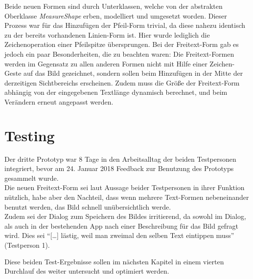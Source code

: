 Beide neuen Formen sind durch Unterklassen, welche von der abstrakten Oberklasse \emph{MeasureShape} erben, modelliert und umgesetzt worden.
Dieser Prozess war für das Hinzufügen der Pfeil-Form trivial, da diese nahezu identisch zu der bereits vorhandenen Linien-Form ist.
Hier wurde lediglich die Zeichenoperation einer Pfeilspitze übersprungen.
Bei der Freitext-Form gab es jedoch ein paar Besonderheiten, die zu beachten waren:
Die Freitext-Formen werden im Gegensatz zu allen anderen Formen nicht mit Hilfe einer Zeichen-Geste auf das Bild gezeichnet, sondern sollen beim Hinzufügen in der Mitte der derzeitigen Sichtbereichs erscheinen.
Zudem muss die Größe der Freitext-Form abhängig von der eingegebenen Textlänge dynamisch berechnet, und beim Verändern erneut angepasst werden. \\

\section{Testing}\label{sec:test3}
Der dritte Prototyp war 8 Tage in den Arbeitsalltag der beiden Testpersonen integriert, bevor am 24. Januar 2018 Feedback zur Benutzung des Prototyps gesammelt wurde. \\

Die neuen Freitext-Form sei laut Aussage beider Testpersonen in ihrer Funktion nützlich, habe aber den Nachteil, dass wenn mehrere Text-Formen nebeneinander benutzt werden, das Bild schnell unübersichtlich werde. \\

Zudem sei der Dialog zum Speichern des Bildes irritierend, da sowohl im Dialog, als auch in der bestehenden App nach einer Beschreibung für das Bild gefragt wird.
Dies sei ``[\dots] lästig, weil man zweimal den selben Text eintippen muss'' (Testperson 1). \\

Diese beiden Test-Ergebnisse sollen im nächsten Kapitel in einem vierten Durchlauf des \hcdp{} weiter untersucht und optimiert werden.
